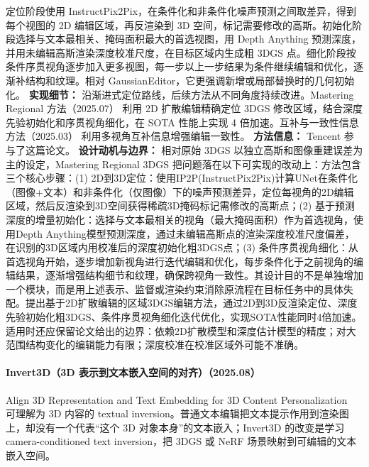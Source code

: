 定位阶段使用 InstructPix2Pix，在条件化和非条件化噪声预测之间取差异，得到每个视图的 2D 编辑区域，再反渲染到 3D 空间，标记需要修改的高斯。初始化阶段选择与文本最相关、掩码面积最大的首选视图，用 Depth Anything 预测深度，并用未编辑高斯渲染深度校准尺度，在目标区域内生成粗 3DGS 点。细化阶段按条件序贯视角逐步加入更多视图，每一步以上一步结果为条件继续编辑和优化，逐渐补结构和纹理。相对 GaussianEditor，它更强调新增或局部替换时的几何初始化。
\textbf{实现细节：} 沿渐进式定位路线，后续方法从不同角度持续改进。Mastering Regional 方法（2025.07） 利用 2D 扩散编辑精确定位 3DGS 修改区域，结合深度先验初始化和序贯视角细化，在 SOTA 性能上实现 4 倍加速。互补与一致性信息方法（2025.03） 利用多视角互补信息增强编辑一致性。
\textbf{方法信息：} Tencent 参与了这篇论文。
\textbf{设计动机与边界：} 相对原始 3DGS 以独立高斯和图像重建误差为主的设定，Mastering Regional 3DGS 把问题落在以下可实现的改动上：方法包含三个核心步骤：(1) 2D到3D定位：使用IP2P(InstructPix2Pix)计算UNet在条件化（图像+文本）和非条件化（仅图像）下的噪声预测差异，定位每视角的2D编辑区域，然后反渲染到3D空间获得稀疏3D掩码标记需修改的高斯点；(2) 基于预测深度的增量初始化：选择与文本最相关的视角（最大掩码面积）作为首选视角，使用Depth Anything模型预测深度，通过未编辑高斯点的渲染深度校准尺度偏差，在识别的3D区域内用校准后的深度初始化粗3DGS点；(3) 条件序贯视角细化：从首选视角开始，逐步增加新视角进行迭代编辑和优化，每步条件化于之前视角的编辑结果，逐渐增强结构细节和纹理，确保跨视角一致性。其设计目的不是单独增加一个模块，而是用上述表示、监督或渲染约束消除原流程在目标任务中的具体失配。提出基于2D扩散编辑的区域3DGS编辑方法，通过2D到3D反渲染定位、深度先验初始化粗3DGS、条件序贯视角细化迭代优化，实现SOTA性能同时4倍加速。适用时还应保留论文给出的边界：依赖2D扩散模型和深度估计模型的精度；对大范围结构变化的编辑能力有限；深度校准在校准区域外可能不准确。
\paragraph{Invert3D（3D 表示到文本嵌入空间的对齐）（2025.08）}
Align 3D Representation and Text Embedding for 3D Content Personalization~\cite{2508_16932} 可理解为 3D 内容的 textual inversion。普通文本编辑把文本提示作用到渲染图上，却没有一个代表“这个 3D 对象本身”的文本嵌入；Invert3D 的改变是学习 camera-conditioned text inversion，把 3DGS 或 NeRF 场景映射到可编辑的文本嵌入空间。

